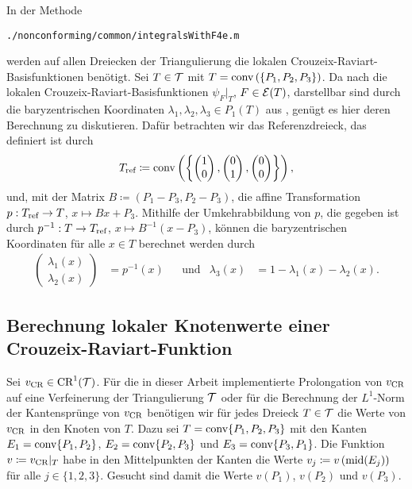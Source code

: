 In der Methode
\begin{center}
  \texttt{./nonconforming/common/integralsWithF4e.m}
\end{center}
werden auf allen Dreiecken der Triangulierung die lokalen
Crouzeix-Raviart-Basis\-funk\-tio\-nen benötigt. 
Sei $T\in\mathcal{T}$ mit $T=\textup{conv}\left(\{P_1,P_2,P_3\}\right)$.
Da nach  die lokalen
Crouzeix-Raviart-Basisfunktionen $\psi_{F}|_T$, $F\in\mathcal{E}(T)$, darstellbar
sind durch die baryzentrischen Koordinaten $\lambda_1,\lambda_2,\lambda_3\in
P_1(T)$ aus , genügt es hier deren
Berechnung zu diskutieren.
Dafür betrachten wir das Referenzdreieck, das definiert ist durch
\begin{align*}
  T_\textup{ref} \coloneqq
  \textup{conv}\left(\left\{
  \begin{pmatrix}
   1\\0 
  \end{pmatrix},
  \begin{pmatrix}
   0\\1 
  \end{pmatrix},
  \begin{pmatrix}
   0\\0 
  \end{pmatrix}
  \right\}\right),
\end{align*}
und, mit der Matrix $B\coloneqq (P_1-P_3,P_2-P_3)$, die affine Transformation
$p:T_\textup{ref} \to T$, $x \mapsto Bx+P_3$. 
Mithilfe der Umkehrabbildung von $p$, die gegeben ist durch $p^{-1}:T\to T_\textup{ref}$,
$x\mapsto B^{-1}(x-P_3)$, können die baryzentrischen Koordinaten für alle $x\in
T$ berechnet werden durch 
\begin{align*}
  \begin{pmatrix}
    \lambda_1(x)\\
    \lambda_2(x)
  \end{pmatrix}
  &=
  p^{-1}(x) &&\text{und}
  &\lambda_3(x)
  &=1-\lambda_1(x)-\lambda_2(x).
\end{align*}


\subsection{Berechnung lokaler Knotenwerte einer Crouzeix-Raviart-Funktion}

Sei $v_\textup{CR}\in\textup{CR}^1(\mathcal{T})$.
Für die in dieser Arbeit implementierte Prolongation von $v_\textup{CR}$ auf eine
Verfeinerung der Triangulierung $\mathcal{T}$ oder für die Berechnung der $L^1$-Norm
der Kantensprünge von $v_\textup{CR}$ benötigen wir für jedes Dreieck $T\in\mathcal{T}$ die
Werte von $v_\textup{CR}$ in den Knoten von $T$. 
Dazu sei $T = \textup{conv}\{P_1, P_2, P_3\}$ mit den Kanten
$E_1 = \textup{conv}\{P_1,P_2\}$, $E_2 = \textup{conv}\{P_2,P_3\}$ und $E_3 =
\textup{conv}\{P_3,P_1\}$. 
Die Funktion $v\coloneqq v_\textup{CR}|_T$ habe in den Mittelpunkten der Kanten die Werte
$v_j\coloneqq v\left(\textup{mid}(E_j)\right)$ für alle $j\in\{1,2,3\}$. 
Gesucht sind damit die Werte $v(P_1)$, $v(P_2)$ und $v(P_3)$.


